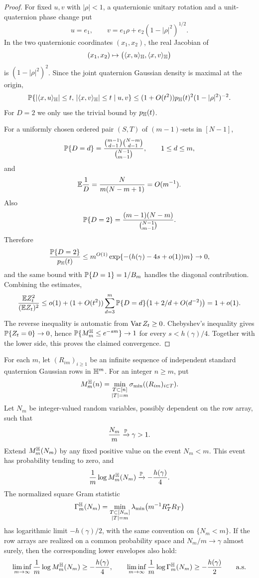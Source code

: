 \begin{proof}
For fixed \(u,v\) with \(|\rho|<1\), a quaternionic unitary rotation and a
unit-quaternion phase change put
\[
  u=e_1,\qquad
  v=e_1\rho+e_2(1-|\rho|^2)^{1/2}.
\]
In the two quaternionic coordinates \((x_1,x_2)\), the real Jacobian of
\[
  (x_1,x_2)\mapsto
  \big(\langle x,u\rangle_{\mathbb{H}},\langle x,v\rangle_{\mathbb{H}}\big)
\]
is \((1-|\rho|^2)^2\).  Since the joint quaternion Gaussian density is maximal
at the origin,
\[
  \mathbb{P}\{|\langle x,u\rangle_{\mathbb{H}}|\le t,\,
        |\langle x,v\rangle_{\mathbb{H}}|\le t\mid u,v\}
  \le (1+O(t^2))p_{\mathbb{H}}(t)^2(1-|\rho|^2)^{-2}.
\]
For \(D=2\) we only use the trivial bound by \(p_{\mathbb{H}}(t)\).

For a uniformly chosen ordered pair \((S,T)\) of \((m-1)\)-sets in \([N-1]\),
\[
  \mathbb{P}\{D=d\}
  =
  \frac{\binom{m-1}{d-1}\binom{N-m}{d-1}}{\binom{N-1}{m-1}},
  \qquad 1\le d\le m,
\]
and
\[
  \mathbb{E}\frac1D
  =
  \frac{N}{m(N-m+1)}
  =O(m^{-1}).
\]
Also
\[
  \mathbb{P}\{D=2\}
  =
  \frac{(m-1)(N-m)}{\binom{N-1}{m-1}}.
\]
Therefore
\[
  \frac{\mathbb{P}\{D=2\}}{p_{\mathbb{H}}(t)}
  \le m^{O(1)}\exp\{-(h(\gamma)-4s+o(1))m\}\to0,
\]
and the same bound with \(\mathbb{P}\{D=1\}=1/B_m\) handles the diagonal contribution.
Combining the estimates,
\[
  \frac{\mathbb{E} Z_t^2}{(\mathbb{E} Z_t)^2}
  \le o(1)
     +(1+O(t^2))
      \sum_{d=3}^m \mathbb{P}\{D=d\}\bigl(1+2/d+O(d^{-2})\bigr)
  =1+o(1).
\]
The reverse inequality is automatic from \(\operatorname{Var} Z_t\ge0\).  Chebyshev's
inequality gives \(\mathbb{P}\{Z_t=0\}\to0\), hence
\(\mathbb{P}\{M_m^{\mathbb{H}}\le e^{-sm}\}\to1\) for every \(s<h(\gamma)/4\).  Together
with the lower side, this proves the claimed convergence.
\end{proof}

\begin{theorem}\label{thm:quat-random-row-count-gaussian}
For each \(m\), let \((R_{im})_{i\ge1}\) be an infinite sequence of independent
standard quaternion Gaussian rows in \(\mathbb{H}^m\).  For an integer \(n\ge m\), put
\[
  M_m^{\mathbb{H}}(n)=
  \min_{\substack{T\subset[n]\\ |T|=m}}\sigma_{\min}((R_{im})_{i\in T}).
\]
Let \(N_m\) be integer-valued random variables, possibly dependent on the row
array, such that
\[
  \frac{N_m}{m}\xrightarrow{\mathbb{P}}\gamma>1 .
\]
Extend \(M_m^{\mathbb{H}}(N_m)\) by any fixed positive value on the event \(N_m<m\).
This event has probability tending to zero, and
\[
  \frac1m\log M_m^{\mathbb{H}}(N_m)
  \xrightarrow{\mathbb{P}}
  -\frac{h(\gamma)}4 .
\]
The normalized square Gram statistic
\[
  \Gamma_m^{\mathbb{H}}(N_m)=
  \min_{\substack{T\subset[N_m]\\ |T|=m}}
  \lambda_{\min}\!\left(m^{-1}R_T^*R_T\right)
\]
has logarithmic limit \(-h(\gamma)/2\), with the same convention on
\(\{N_m<m\}\).  If the row arrays are realized on a common probability space
and \(N_m/m\to\gamma\) almost surely, then the corresponding lower envelopes
also hold:
\[
  \liminf_{m\to\infty}\frac1m\log M_m^{\mathbb{H}}(N_m)
  \ge -\frac{h(\gamma)}4,\qquad
  \liminf_{m\to\infty}\frac1m\log \Gamma_m^{\mathbb{H}}(N_m)
  \ge -\frac{h(\gamma)}2
  \qquad\hbox{a.s.}
\]
\end{theorem}

